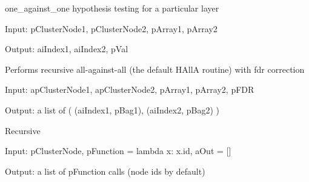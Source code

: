 \documentclass[letterpaper,10pt,english]{sphinxmanual}
\begin{document}
\begin{fulllineitems}
\end{fulllineitems}


\begin{fulllineitems}
\label{index:halla.hierarchy.one_against_one}
one\_against\_one hypothesis testing for a particular layer

Input: pClusterNode1, pClusterNode2, pArray1, pArray2

Output: aiIndex1, aiIndex2, pVal

\end{fulllineitems}


\begin{fulllineitems}
\label{index:halla.hierarchy.recursive_all_against_all}
Performs recursive all-against-all (the default HAllA routine) with fdr correction

Input: apClusterNode1, apClusterNode2, pArray1, pArray2, pFDR

Output: a list of ( (aiIndex1, pBag1), (aiIndex2, pBag2) )

\end{fulllineitems}


\begin{fulllineitems}
\label{index:halla.hierarchy.reduce_tree}
Recursive

Input: pClusterNode, pFunction = lambda x: x.id, aOut = {[}{]}

Output: a list of pFunction calls (node ids by default)

\end{fulllineitems}

\end{document}
